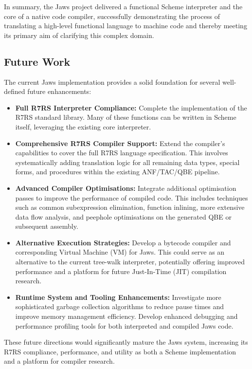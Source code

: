 \documentclass[final]{cmpreport_02}
\begin{document}
In summary, the Jaws project delivered a functional Scheme interpreter and the core of a native code compiler, successfully demonstrating the process of translating a high-level functional language to machine code and thereby meeting its primary aim of clarifying this complex domain.
\subsection{Future Work}

The current Jaws implementation provides a solid foundation for several well-defined future enhancements:

\begin{itemize}
    \item \textbf{Full R7RS Interpreter Compliance:} Complete the implementation of the R7RS standard library. Many of these functions can be written in Scheme itself, leveraging the existing core interpreter.
    \item \textbf{Comprehensive R7RS Compiler Support:} Extend the compiler's capabilities to cover the full R7RS language specification. This involves systematically adding translation logic for all remaining data types, special forms, and procedures within the existing ANF/TAC/QBE pipeline.
    \item \textbf{Advanced Compiler Optimisations:} Integrate additional optimisation passes to improve the performance of compiled code. This includes techniques such as common subexpression elimination, function inlining, more extensive data flow analysis, and peephole optimisations on the generated QBE or subsequent assembly.
    \item \textbf{Alternative Execution Strategies:} Develop a bytecode compiler and corresponding Virtual Machine (VM) for Jaws. This could serve as an alternative to the current tree-walk interpreter, potentially offering improved performance and a platform for future Just-In-Time (JIT) compilation research.
    \item \textbf{Runtime System and Tooling Enhancements:} Investigate more sophisticated garbage collection algorithms to reduce pause times and improve memory management efficiency. Develop enhanced debugging and performance profiling tools for both interpreted and compiled Jaws code.
\end{itemize}

These future directions would significantly mature the Jaws system, increasing its R7RS compliance, performance, and utility as both a Scheme implementation and a platform for compiler research.
\newpage
\end{document}
